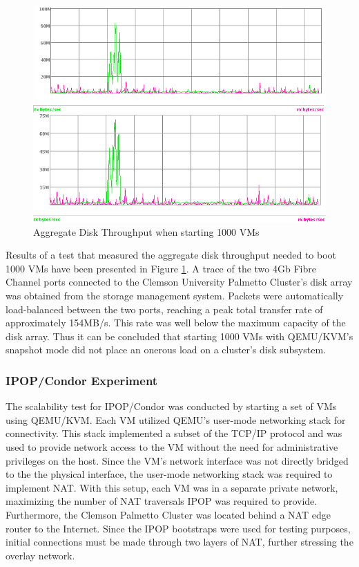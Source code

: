 %
\begin{figure}
\begin{centering}
\includegraphics[width=1\columnwidth]{figures/1000VMboot}
\par\end{centering}
\caption{\label{fig:Aggregate-Disk-Throughput}Aggregate Disk Throughput when
starting 1000 VMs}
\end{figure}

Results of a test that measured the aggregate disk throughput needed
to boot 1000 VMs have been presented in Figure \ref{fig:Aggregate-Disk-Throughput}.
A trace of the two 4Gb Fibre  Channel ports connected to the Clemson
University Palmetto Cluster's disk array was obtained from the storage
management system. Packets were automatically load-balanced between
the two ports, reaching a peak total transfer rate of approximately
154MB/s. This rate was well below the maximum capacity of the disk
array. Thus it can be concluded that starting 1000 VMs with QEMU/KVM's
snapshot mode did not place an onerous load on a cluster's disk subsystem.

\subsubsection{\label{sub:IPOP/Condor-Experiment}IPOP/Condor Experiment }

The scalability test for IPOP/Condor was conducted by starting a set
of VMs using QEMU/KVM. Each VM utilized QEMU's user-mode networking
stack for connectivity. This stack implemented a subset of the TCP/IP
protocol and was used to provide network access to the VM without
the need for administrative privileges on the host. Since the VM's
network interface was not directly bridged to the the physical interface,
the user-mode networking stack was required to implement NAT. With
this setup, each VM was in a separate private network, maximizing
the number of NAT traversals IPOP was required to provide. Furthermore,
the Clemson Palmetto Cluster was located behind a NAT edge router
to the Internet. Since the IPOP bootstraps were used for testing purposes,
initial connections must be made through two layers of NAT, further
stressing the overlay network.

